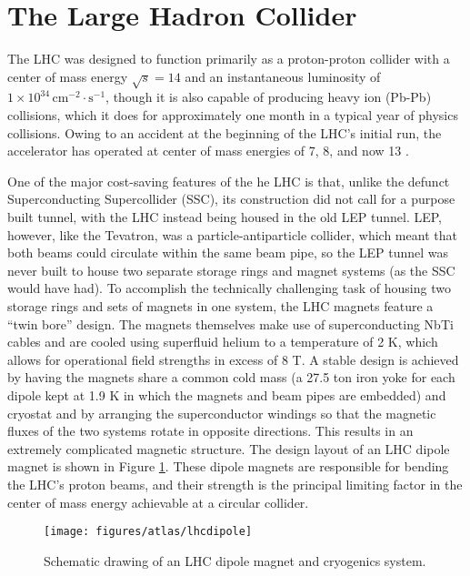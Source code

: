 \section{The Large Hadron Collider}
The LHC was designed to function primarily as a proton-proton collider with a center of mass energy $\sqrt{s}=14$ \TeV and an instantaneous luminosity of $1\times10^{34}\,\text{cm}^{-2}\cdot\text{s}^{-1}$, though it is also capable of producing heavy ion (Pb-Pb) collisions, which it does for approximately one month in a typical year of physics collisions.  Owing to an accident at the beginning of the LHC's initial run, the accelerator has operated at center of mass energies of 7, 8, and now 13 \TeV.

One of the major cost-saving features of the he LHC is that, unlike the defunct Superconducting Supercollider (SSC), its construction did not call for a purpose built tunnel, with the LHC instead being housed in the old LEP tunnel.  LEP, however, like the Tevatron, was a particle-antiparticle collider, which meant that both beams could circulate within the same beam pipe, so the LEP tunnel was never built to house two separate storage rings and magnet systems (as the SSC would have had).  To accomplish the technically challenging task of housing two storage rings and sets of magnets in one system, the LHC magnets feature a ``twin bore'' design.  The magnets themselves make use of superconducting NbTi cables and are cooled using superfluid helium to a temperature of 2 K, which allows for operational field strengths in excess of 8 T.  A stable design is achieved by having the magnets share a common cold mass (a 27.5 ton iron yoke for each dipole kept at 1.9 K in which the magnets and beam pipes are embedded) and cryostat and by arranging the superconductor windings so that the magnetic fluxes of the two systems rotate in opposite directions.  This results in an extremely complicated magnetic structure.  The design layout of an LHC dipole magnet is shown in Figure \ref{fig:lhcdipole}.  These dipole magnets are responsible for bending the LHC's proton beams, and their strength is the principal limiting factor in the center of mass energy achievable at a circular collider.

\begin{figure}[!htbp]\captionsetup{justification=centering}
  \centering
  \texttt{[image: figures/atlas/lhcdipole]}
  \caption{Schematic drawing of an LHC dipole magnet and cryogenics system.}
  \label{fig:lhcdipole}
\end{figure}

